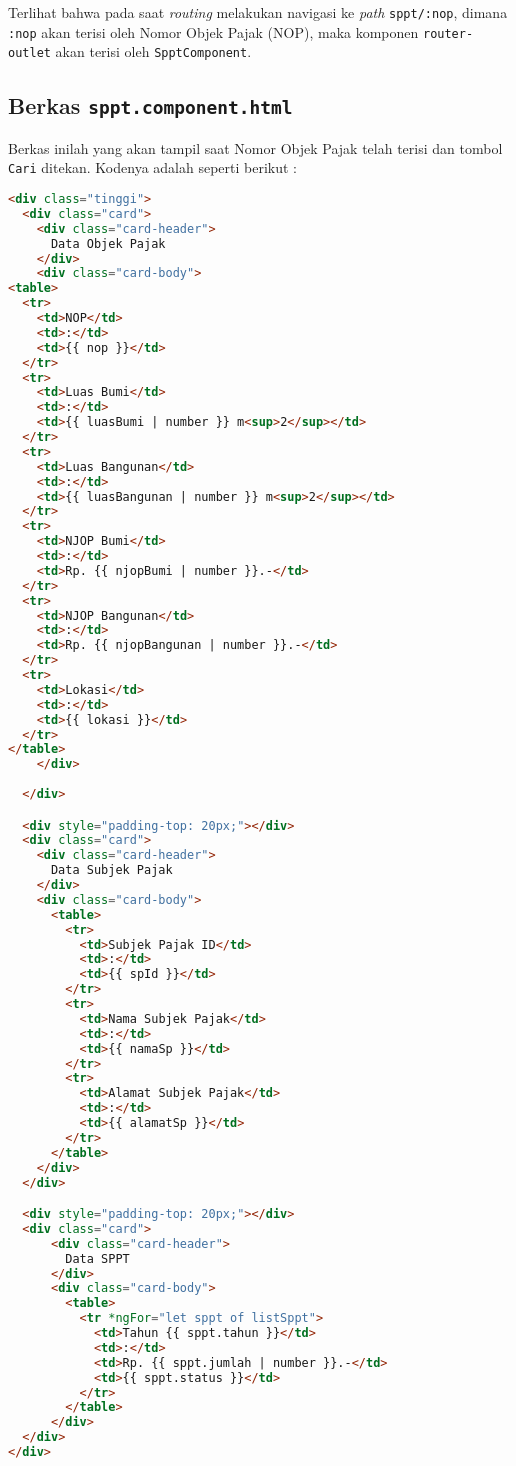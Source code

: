 \documentclass[pdftex,12pt, oneside]{article}
\begin{document}
Terlihat bahwa pada saat \textit{routing} melakukan navigasi ke \textit{path} \texttt{sppt/:nop}, dimana \texttt{:nop} akan terisi oleh Nomor Objek Pajak (NOP), maka komponen \texttt{router-outlet} akan terisi oleh \texttt{SpptComponent}.

\subsection{Berkas \texttt{sppt.component.html}}

Berkas inilah yang akan tampil saat Nomor Objek Pajak telah terisi dan tombol \texttt{Cari} ditekan. Kodenya adalah seperti berikut :

\begin{lstlisting}[language=html]
<div class="tinggi">
  <div class="card">
    <div class="card-header">
      Data Objek Pajak
    </div>
    <div class="card-body">
<table>
  <tr>
    <td>NOP</td>
    <td>:</td>
    <td>{{ nop }}</td>
  </tr>
  <tr>
    <td>Luas Bumi</td>
    <td>:</td>
    <td>{{ luasBumi | number }} m<sup>2</sup></td>
  </tr>
  <tr>
    <td>Luas Bangunan</td>
    <td>:</td>
    <td>{{ luasBangunan | number }} m<sup>2</sup></td>
  </tr>
  <tr>
    <td>NJOP Bumi</td>
    <td>:</td>
    <td>Rp. {{ njopBumi | number }}.-</td>
  </tr>
  <tr>
    <td>NJOP Bangunan</td>
    <td>:</td>
    <td>Rp. {{ njopBangunan | number }}.-</td>
  </tr>
  <tr>
    <td>Lokasi</td>
    <td>:</td>
    <td>{{ lokasi }}</td>
  </tr>
</table>
    </div>
    
  </div>

  <div style="padding-top: 20px;"></div>
  <div class="card">
    <div class="card-header">
      Data Subjek Pajak
    </div>
    <div class="card-body">
      <table>
        <tr>
          <td>Subjek Pajak ID</td>
          <td>:</td>
          <td>{{ spId }}</td>
        </tr>
        <tr>
          <td>Nama Subjek Pajak</td>
          <td>:</td>
          <td>{{ namaSp }}</td>
        </tr>
        <tr>
          <td>Alamat Subjek Pajak</td>
          <td>:</td>
          <td>{{ alamatSp }}</td>
        </tr>
      </table>
    </div>
  </div>

  <div style="padding-top: 20px;"></div>
  <div class="card">
      <div class="card-header">
        Data SPPT
      </div>
      <div class="card-body">
        <table>
          <tr *ngFor="let sppt of listSppt">
            <td>Tahun {{ sppt.tahun }}</td>
            <td>:</td>
            <td>Rp. {{ sppt.jumlah | number }}.-</td>
            <td>{{ sppt.status }}</td>
          </tr>
        </table>
      </div>
  </div>  
</div>
\end{lstlisting}
\end{document}
